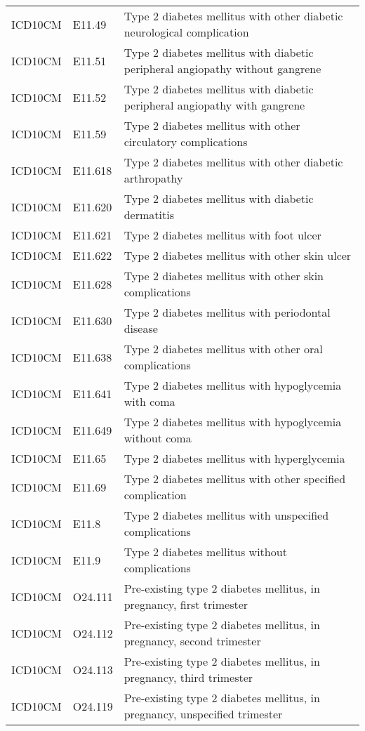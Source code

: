 \begin{longtable}{p{}p{}p{}}
  ICD10CM & E11.49 & Type 2 diabetes mellitus with other diabetic neurological complication \\ 
  ICD10CM & E11.51 & Type 2 diabetes mellitus with diabetic peripheral angiopathy without gangrene \\ 
  ICD10CM & E11.52 & Type 2 diabetes mellitus with diabetic peripheral angiopathy with gangrene \\ 
  ICD10CM & E11.59 & Type 2 diabetes mellitus with other circulatory complications \\ 
  ICD10CM & E11.618 & Type 2 diabetes mellitus with other diabetic arthropathy \\ 
  ICD10CM & E11.620 & Type 2 diabetes mellitus with diabetic dermatitis \\ 
  ICD10CM & E11.621 & Type 2 diabetes mellitus with foot ulcer \\ 
  ICD10CM & E11.622 & Type 2 diabetes mellitus with other skin ulcer \\ 
  ICD10CM & E11.628 & Type 2 diabetes mellitus with other skin complications \\ 
  ICD10CM & E11.630 & Type 2 diabetes mellitus with periodontal disease \\ 
  ICD10CM & E11.638 & Type 2 diabetes mellitus with other oral complications \\ 
  ICD10CM & E11.641 & Type 2 diabetes mellitus with hypoglycemia with coma \\ 
  ICD10CM & E11.649 & Type 2 diabetes mellitus with hypoglycemia without coma \\ 
  ICD10CM & E11.65 & Type 2 diabetes mellitus with hyperglycemia \\ 
  ICD10CM & E11.69 & Type 2 diabetes mellitus with other specified complication \\ 
  ICD10CM & E11.8 & Type 2 diabetes mellitus with unspecified complications \\ 
  ICD10CM & E11.9 & Type 2 diabetes mellitus without complications \\ 
  ICD10CM & O24.111 & Pre-existing type 2 diabetes mellitus, in pregnancy, first trimester \\ 
  ICD10CM & O24.112 & Pre-existing type 2 diabetes mellitus, in pregnancy, second trimester \\ 
  ICD10CM & O24.113 & Pre-existing type 2 diabetes mellitus, in pregnancy, third trimester \\ 
  ICD10CM & O24.119 & Pre-existing type 2 diabetes mellitus, in pregnancy, unspecified trimester \\ 

\end{longtable}
